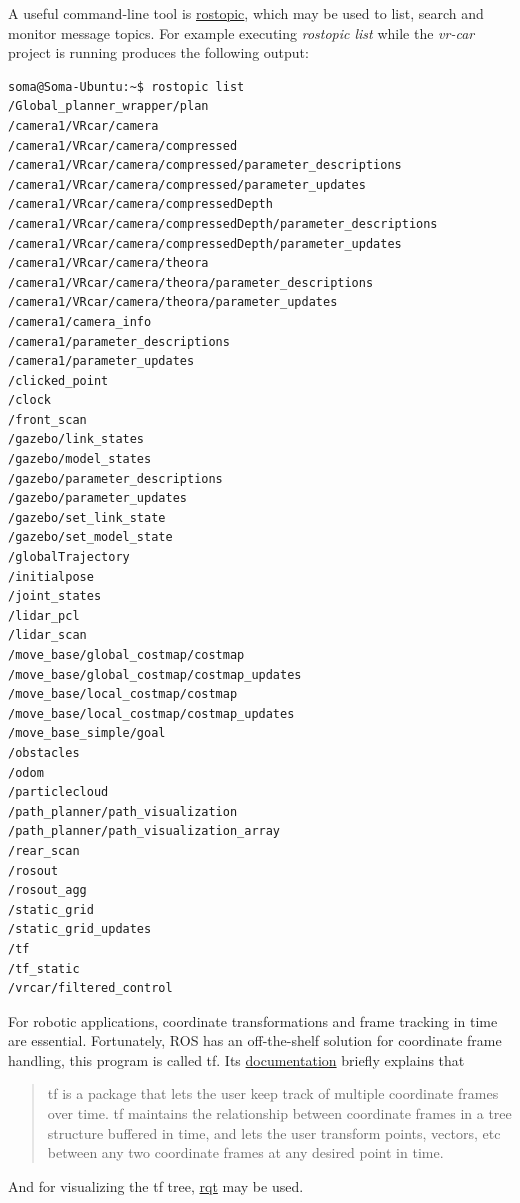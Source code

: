 A useful command-line tool is \href{http://wiki.ros.org/rostopic}{rostopic}, which may be used to list, search and monitor message topics. For example executing \textit{rostopic list} while the \textit{vr-car} project is running produces the following output:

\begin{minipage}{\textwidth}
\begin{lstlisting}[language=bash]
soma@Soma-Ubuntu:~$ rostopic list
/Global_planner_wrapper/plan
/camera1/VRcar/camera
/camera1/VRcar/camera/compressed
/camera1/VRcar/camera/compressed/parameter_descriptions
/camera1/VRcar/camera/compressed/parameter_updates
/camera1/VRcar/camera/compressedDepth
/camera1/VRcar/camera/compressedDepth/parameter_descriptions
/camera1/VRcar/camera/compressedDepth/parameter_updates
/camera1/VRcar/camera/theora
/camera1/VRcar/camera/theora/parameter_descriptions
/camera1/VRcar/camera/theora/parameter_updates
/camera1/camera_info
/camera1/parameter_descriptions
/camera1/parameter_updates
/clicked_point
/clock
/front_scan
/gazebo/link_states
/gazebo/model_states
/gazebo/parameter_descriptions
/gazebo/parameter_updates
/gazebo/set_link_state
/gazebo/set_model_state
/globalTrajectory
/initialpose
/joint_states
/lidar_pcl
/lidar_scan
/move_base/global_costmap/costmap
/move_base/global_costmap/costmap_updates
/move_base/local_costmap/costmap
/move_base/local_costmap/costmap_updates
/move_base_simple/goal
/obstacles
/odom
/particlecloud
/path_planner/path_visualization
/path_planner/path_visualization_array
/rear_scan
/rosout
/rosout_agg
/static_grid
/static_grid_updates
/tf
/tf_static
/vrcar/filtered_control
\end{lstlisting}
\end{minipage}

For robotic applications, coordinate transformations and frame tracking in time are essential. Fortunately, ROS has an off-the-shelf solution for coordinate frame handling, this program is called tf. Its \href{http://wiki.ros.org/tf}{documentation} briefly explains that

\begin{quote}
	tf is a package that lets the user keep track of multiple coordinate frames over time. tf maintains the relationship between coordinate frames in a tree structure buffered in time, and lets the user transform points, vectors, etc between any two coordinate frames at any desired point in time.
\end{quote}

And for visualizing the tf tree, \href{http://wiki.ros.org/rqt}{rqt} may be used.

